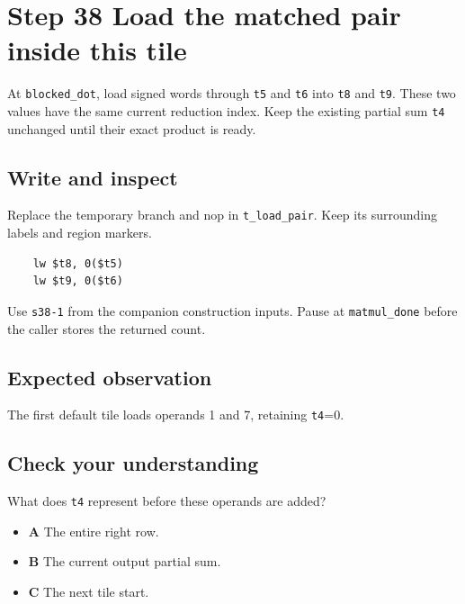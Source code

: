 \section{Step 38 Load the matched pair inside this tile}\label{matmul-s38}

At \texttt{blocked\_dot}, load signed words through \texttt{t5} and \texttt{t6} into \texttt{t8} and \texttt{t9}. These two values have the same current reduction index. Keep the existing partial sum \texttt{t4} unchanged until their exact product is ready.

\subsection{Write and inspect}
Replace the temporary branch and nop in \texttt{t\_load\_pair}. Keep its surrounding labels and region markers.

\begin{verbatim}
    lw $t8, 0($t5)
    lw $t9, 0($t6)
\end{verbatim}
Use \texttt{s38-1} from the companion construction inputs. Pause at \texttt{matmul\_done} before the caller stores the returned count.

\subsection{Expected observation}
The first default tile loads operands 1 and 7, retaining \texttt{t4}=0.

\subsection{Check your understanding}
What does \texttt{t4} represent before these operands are added?

\begin{itemize}
\item \textbf{A} The entire right row.
\item \textbf{B} The current output partial sum.
\item \textbf{C} The next tile start.
\end{itemize}
